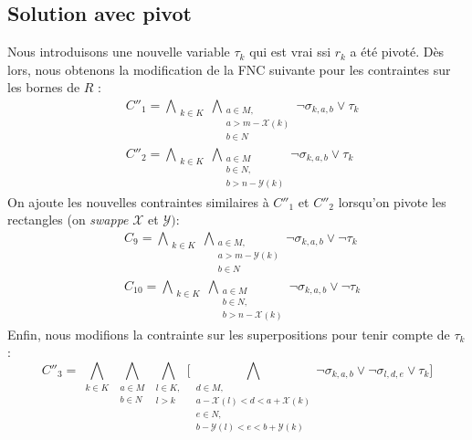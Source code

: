 \documentclass[a4paper]{article}
\begin{document}
\subsection{Solution avec pivot}
Nous introduisons une nouvelle variable $\tau_k$ qui est vrai ssi $r_k$ a été pivoté. Dès lors, nous obtenons la modification de la FNC suivante pour les contraintes sur les bornes de $R$ :
\begin{equation*}
\begin{split}
	&C''_1 = \bigwedge\limits_{\substack{k\in K}} \bigwedge\limits_{\substack{a \in M, \\ a > m - \mathcal{X}(k) \\ b\in N}} \lnot \sigma_{k,a, b} \lor \tau_k \\
	&C''_2 = \bigwedge\limits_{\substack{k\in K}} \bigwedge\limits_{\substack{a \in M \\ b \in N,\\ b > n - \mathcal{Y}(k)}} \lnot \sigma_{k,a, b} \lor \tau_k
\end{split}
\end{equation*}
On ajoute les nouvelles contraintes similaires à $C''_1$ et $C''_2$ lorsqu'on pivote les rectangles (on \textit{swappe} $\mathcal{X}$ et $\mathcal{Y})$: 
\begin{equation*}
\begin{split}
	&C_9 = \bigwedge\limits_{\substack{k\in K}} \bigwedge\limits_{\substack{a \in M, \\ a > m - \mathcal{Y}(k) \\ b\in N}} \lnot \sigma_{k,a, b} \lor \lnot \tau_k \\
	&C_{10} = \bigwedge\limits_{\substack{k\in K}} \bigwedge\limits_{\substack{a \in M \\ b \in N,\\ b > n - \mathcal{X}(k)}} \lnot \sigma_{k,a, b} \lor \lnot \tau_k
\end{split}
\end{equation*}
Enfin, nous modifions la contrainte sur les superpositions pour tenir compte de $\tau_k$ : 
\begin{equation*}
C''_3 = 	\bigwedge\limits_{\substack{k\in K}}
			\bigwedge\limits_{\substack{a \in M \\ b \in N}}
				\bigwedge\limits_{\substack{l\in K,\\ l > k}}
					\bigg[
					\bigwedge\limits_{\substack{d \in M,\\ a-\mathcal{X}(l) < d < a +\mathcal{X}(k) \\  e \in N, \\b-\mathcal{Y}(l) < e < b +\mathcal{Y}(k)}}
						\lnot \sigma_{k,a,b} \lor \lnot \sigma_{l,d,e}	 \lor \tau_k
					\bigg]
\end{equation*}
\end{document}
